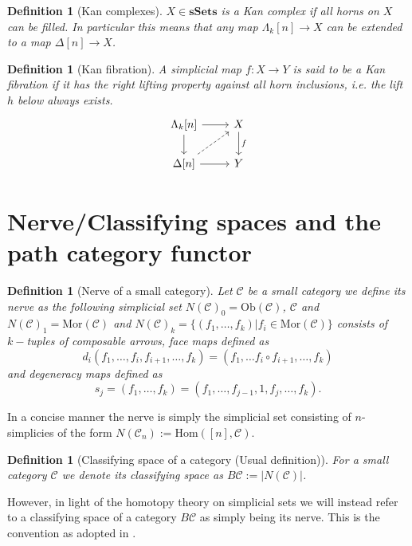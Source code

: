\documentclass[12pt]{report}
\numberwithin{equation}{section}
\newcommand{\Hom}{{\mathrm{Hom}}}
\newtheorem{definition}[dummy]{Definition}
\begin{document}
	\begin{definition}[Kan complexes]
		$X \in \mathbf{sSets}$ is a Kan complex if all horns on $X$ can be filled. In particular this means that any map $\Lambda_k[n] \to X$ can be extended to a map $\Delta[n] \to X$.
	\end{definition}
	
	\begin{definition}[Kan fibration]
		A simplicial map \( f: X\to Y \) is said to be a Kan fibration if it has the right lifting property against all horn inclusions, i.e. the lift \( h \) below always exists.
		\[\begin{tikzcd}
			{\Lambda_k[n]} & X \\
			{\Delta[n]} & Y
			\arrow[from=1-1, to=1-2]
			\arrow[from=1-1, to=2-1]
			\arrow["f", from=1-2, to=2-2]
			\arrow[dashed, from=2-1, to=1-2]
			\arrow[from=2-1, to=2-2]
		\end{tikzcd}\]
	\end{definition}

	
	
	\section{Nerve/Classifying spaces and the path category functor	}
	\begin{definition}[Nerve of a small category]
		Let $\mathcal{C}$ be a small category we define its nerve as the following simplicial set $N(\mathcal{C})_0=\mathrm{Ob}(\mathcal{C})$, $\mathcal{C}$ and $N(\mathcal{C})_1 = \mathrm{Mor}(\mathcal{C})$ and $N(\mathcal{C})_k=\{(f_1,\ldots,f_k)| f_i \in \mathrm{Mor}(\mathcal{C})\}$ consists of $k-$tuples of composable arrows, face maps defined as $$d_i(f_1,\ldots, f_i,f_{i+1}, \ldots, f_k)=(f_1,\ldots f_i\circ f_{i+1}, \ldots, f_k)$$ and degeneracy maps defined as $$s_j=(f_1,\ldots,f_k)=(f_1,\ldots,f_{j-1}, 1, f_j,\ldots,f_k).$$
	\end{definition}
	
	In a concise manner the nerve is simply the simplicial set consisting of $n$-simplicies of the form $N(\mathcal{C}_n):=\Hom([n], \mathcal{C})$.
	

	\begin{definition}[Classifying space of a category (Usual definition)]
		For a small category $\mathcal{C}$ we denote its classifying space as $B\mathcal{C} := |N(\mathcal{C})|$.
	\end{definition}
	
	However, in light of the homotopy theory on simplicial sets we will instead refer to a classifying space of a category $B \mathcal{C}$ as simply being its nerve. This is the convention as adopted in \cite{Goerss_Jardine_2009}.
	
\end{document}
